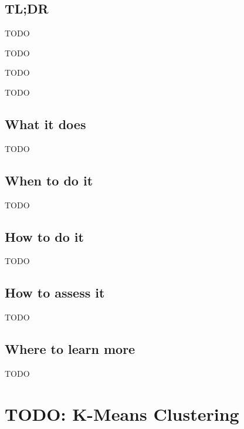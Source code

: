 \documentclass[
]{book}
\providecommand{\tightlist}{%
  \setlength{\itemsep}{0pt}\setlength{\parskip}{0pt}}
\begin{document}
\hypertarget{tldr-20}{%
\section{TL;DR}\label{tldr-20}}

\begin{description}
\tightlist
\item[What it does]
TODO
\item[When to do it]
TODO
\item[How to do it]
TODO
\item[How to assess it]
TODO
\end{description}

\hypertarget{what-it-does-20}{%
\section{What it does}\label{what-it-does-20}}

TODO

\hypertarget{when-to-do-it-20}{%
\section{When to do it}\label{when-to-do-it-20}}

TODO

\hypertarget{how-to-do-it-20}{%
\section{How to do it}\label{how-to-do-it-20}}

TODO

\hypertarget{how-to-assess-it-20}{%
\section{How to assess it}\label{how-to-assess-it-20}}

TODO

\hypertarget{where-to-learn-more-20}{%
\section{Where to learn more}\label{where-to-learn-more-20}}

TODO

\hypertarget{k-means-clustering}{%
\chapter{TODO: K-Means Clustering}\label{k-means-clustering}}
\end{document}
